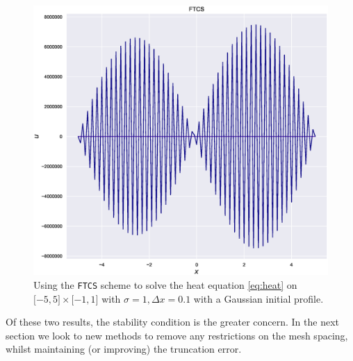 \documentclass[11pt, a4paper, draft]{article}
\begin{document}
\begin{figure}
\begin{minipage}[b]{0.49\textwidth}
                \includegraphics[width=\textwidth]{Figures/unstableFTCSheat.eps}
            \end{minipage} %
            \caption{Using the \texttt{FTCS} scheme to solve the heat equation \eqref{eq:heat} on $ \lbrack -5,5\rbrack \times\lbrack -1,1\rbrack$ with $\sigma =1, \Delta x = 0.1$ with a Gaussian initial profile.} 
            \label{fig:FTCSunstable}
        \end{figure}
        
        Of these two results, the stability condition is the greater concern. In the next section we look to new methods to remove any restrictions on the mesh spacing, whilst maintaining (or improving) the truncation error.
        
\end{document}
